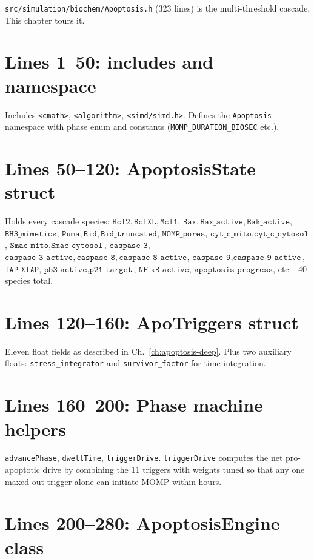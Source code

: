 \documentclass[11pt,letterpaper,twoside,openany]{book}
\newcommand{\code}[1]{\texttt{#1}}
\newcommand{\file}[1]{\texttt{\small#1}}
\begin{document}
\file{src/simulation/biochem/Apoptosis.h} (323 lines) is the
multi-threshold cascade. This chapter tours it.

\section{Lines 1--50: includes and namespace}

Includes \code{<cmath>}, \code{<algorithm>}, \code{<simd/simd.h>}.
Defines the \code{Apoptosis} namespace with phase enum and
constants (\code{MOMP\_DURATION\_BIOSEC} etc.).

\section{Lines 50--120: ApoptosisState struct}

Holds every cascade species: $\code{Bcl2}, \code{BclXL}, \code{Mcl1}$,
$\code{Bax}, \code{Bax\_active}, \code{Bak\_active}$,
$\code{BH3\_mimetics}$, $\code{Puma}, \code{Bid}, \code{Bid\_truncated}$,
$\code{MOMP\_pores}$, $\code{cyt\_c\_mito}, \code{cyt\_c\_cytosol}$,
$\code{Smac\_mito}, \code{Smac\_cytosol}$, $\code{caspase\_3}$,
$\code{caspase\_3\_active}, \code{caspase\_8}, \code{caspase\_8\_active}$,
$\code{caspase\_9}, \code{caspase\_9\_active}$, $\code{IAP\_XIAP}$,
$\code{p53\_active}, \code{p21\_target}$, $\code{NF\_kB\_active}$,
$\code{apoptosis\_progress}$, etc. ~40 species total.

\section{Lines 120--160: ApoTriggers struct}

Eleven float fields as described in Ch.~\ref{ch:apoptosis-deep}.
Plus two auxiliary floats: \code{stress\_integrator} and
\code{survivor\_factor} for time-integration.

\section{Lines 160--200: Phase machine helpers}

\code{advancePhase}, \code{dwellTime}, \code{triggerDrive}.
\code{triggerDrive} computes the net pro-apoptotic drive by
combining the 11 triggers with weights tuned so that any one
maxed-out trigger alone can initiate MOMP within hours.

\section{Lines 200--280: ApoptosisEngine class}
\end{document}
